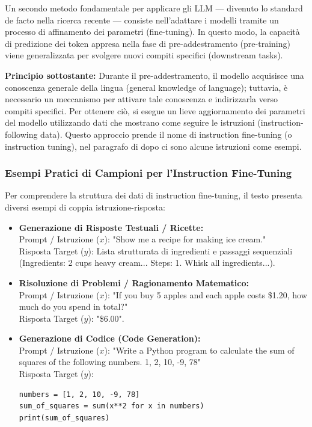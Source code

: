 Un secondo metodo fondamentale per applicare gli LLM — divenuto lo standard de facto nella ricerca recente — consiste nell'adattare i modelli tramite un processo di affinamento dei parametri (fine-tuning). In questo modo, la capacità di predizione dei token appresa nella fase di pre-addestramento (pre-training) viene generalizzata per svolgere nuovi compiti specifici (downstream tasks).

\textbf{Principio sottostante:} Durante il pre-addestramento, il modello acquisisce una conoscenza generale della lingua (general knowledge of language); tuttavia, è necessario un meccanismo per attivare tale conoscenza e indirizzarla verso compiti specifici. Per ottenere ciò, si esegue un lieve aggiornamento dei parametri del modello utilizzando dati che mostrano come seguire le istruzioni (instruction-following data). Questo approccio prende il nome di instruction fine-tuning 
(o instruction tuning), nel paragrafo di dopo ci sono alcune istruzioni come esempi.

\subsubsection{Esempi Pratici di Campioni per l'Instruction Fine-Tuning}
Per comprendere la struttura dei dati di instruction fine-tuning, il testo presenta diversi esempi di coppia istruzione-risposta:

\begin{itemize}
    \item \textbf{Generazione di Risposte Testuali / Ricette:} \\
    Prompt / Istruzione ($x$): "Show me a recipe for making ice cream." \\
    Risposta Target ($y$): Lista strutturata di ingredienti e passaggi sequenziali (Ingredients: 2 cups heavy cream... Steps: 1. Whisk all ingredients...).
    
    \item \textbf{Risoluzione di Problemi / Ragionamento Matematico:} \\
    Prompt / Istruzione ($x$): "If you buy 5 apples and each apple costs \$1.20, how much do you spend in total?" \\
    Risposta Target ($y$): "\$6.00".
    
    \item \textbf{Generazione di Codice (Code Generation):} \\
    Prompt / Istruzione ($x$): "Write a Python program to calculate the sum of squares of the following numbers. 1, 2, 10, -9, 78" \\
    Risposta Target ($y$):
\begin{verbatim}
numbers = [1, 2, 10, -9, 78]
sum_of_squares = sum(x**2 for x in numbers)
print(sum_of_squares)
\end{verbatim}
\end{itemize}

